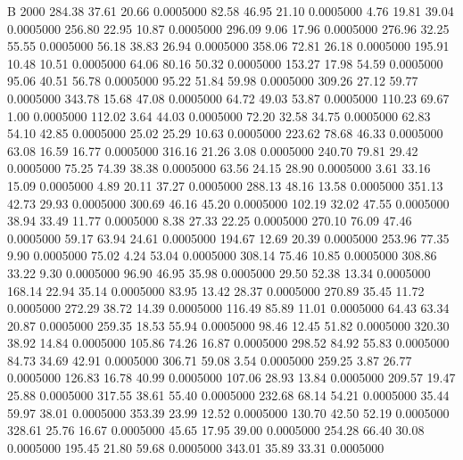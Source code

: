 


     B    2000
 284.38   37.61   20.66   0.0005000
  82.58   46.95   21.10   0.0005000
   4.76   19.81   39.04   0.0005000
 256.80   22.95   10.87   0.0005000
 296.09    9.06   17.96   0.0005000
 276.96   32.25   55.55   0.0005000
  56.18   38.83   26.94   0.0005000
 358.06   72.81   26.18   0.0005000
 195.91   10.48   10.51   0.0005000
  64.06   80.16   50.32   0.0005000
 153.27   17.98   54.59   0.0005000
  95.06   40.51   56.78   0.0005000
  95.22   51.84   59.98   0.0005000
 309.26   27.12   59.77   0.0005000
 343.78   15.68   47.08   0.0005000
  64.72   49.03   53.87   0.0005000
 110.23   69.67    1.00   0.0005000
 112.02    3.64   44.03   0.0005000
  72.20   32.58   34.75   0.0005000
  62.83   54.10   42.85   0.0005000
  25.02   25.29   10.63   0.0005000
 223.62   78.68   46.33   0.0005000
  63.08   16.59   16.77   0.0005000
 316.16   21.26    3.08   0.0005000
 240.70   79.81   29.42   0.0005000
  75.25   74.39   38.38   0.0005000
  63.56   24.15   28.90   0.0005000
   3.61   33.16   15.09   0.0005000
   4.89   20.11   37.27   0.0005000
 288.13   48.16   13.58   0.0005000
 351.13   42.73   29.93   0.0005000
 300.69   46.16   45.20   0.0005000
 102.19   32.02   47.55   0.0005000
  38.94   33.49   11.77   0.0005000
   8.38   27.33   22.25   0.0005000
 270.10   76.09   47.46   0.0005000
  59.17   63.94   24.61   0.0005000
 194.67   12.69   20.39   0.0005000
 253.96   77.35    9.90   0.0005000
  75.02    4.24   53.04   0.0005000
 308.14   75.46   10.85   0.0005000
 308.86   33.22    9.30   0.0005000
  96.90   46.95   35.98   0.0005000
  29.50   52.38   13.34   0.0005000
 168.14   22.94   35.14   0.0005000
  83.95   13.42   28.37   0.0005000
 270.89   35.45   11.72   0.0005000
 272.29   38.72   14.39   0.0005000
 116.49   85.89   11.01   0.0005000
  64.43   63.34   20.87   0.0005000
 259.35   18.53   55.94   0.0005000
  98.46   12.45   51.82   0.0005000
 320.30   38.92   14.84   0.0005000
 105.86   74.26   16.87   0.0005000
 298.52   84.92   55.83   0.0005000
  84.73   34.69   42.91   0.0005000
 306.71   59.08    3.54   0.0005000
 259.25    3.87   26.77   0.0005000
 126.83   16.78   40.99   0.0005000
 107.06   28.93   13.84   0.0005000
 209.57   19.47   25.88   0.0005000
 317.55   38.61   55.40   0.0005000
 232.68   68.14   54.21   0.0005000
  35.44   59.97   38.01   0.0005000
 353.39   23.99   12.52   0.0005000
 130.70   42.50   52.19   0.0005000
 328.61   25.76   16.67   0.0005000
  45.65   17.95   39.00   0.0005000
 254.28   66.40   30.08   0.0005000
 195.45   21.80   59.68   0.0005000
 343.01   35.89   33.31   0.0005000
